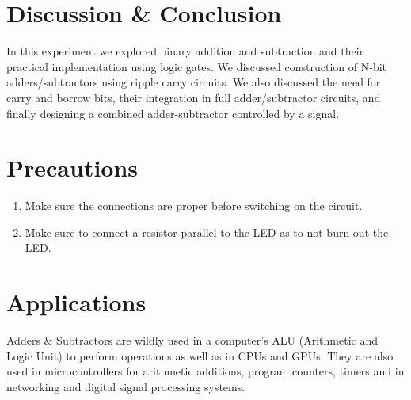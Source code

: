 \section{Discussion \& Conclusion}



In this experiment we explored binary addition and subtraction and their practical implementation using logic gates. We discussed construction of N-bit adders/subtractors using ripple carry circuits. We also discussed the need for carry and borrow bits, their integration in full adder/subtractor circuits, and finally designing a combined adder-subtractor controlled by a signal.

\section{Precautions}

\begin{enumerate}
    \item Make sure the connections are proper before switching on the circuit.
    \item Make sure to connect a resistor parallel to the LED as to not burn out the LED.
\end{enumerate}

\section{Applications}
Adders \& Subtractors are wildly used in a computer's ALU (Arithmetic and Logic Unit) to perform operations as well as in CPUs and GPUs.
They are also used in microcontrollers for arithmetic additions, program counters, timers and in networking and digital signal processing systems.